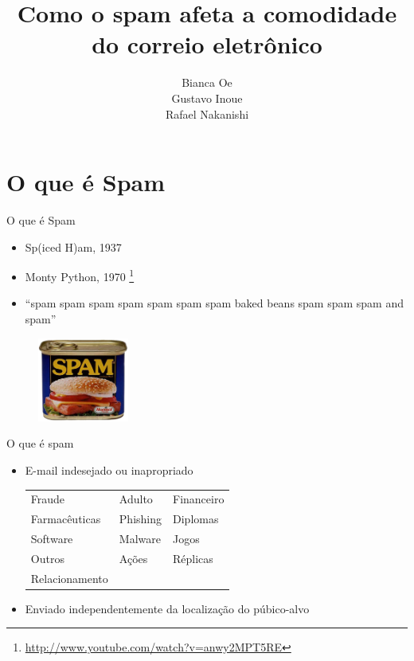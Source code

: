 \documentclass[dvipdfm]{beamer}
\title{Como o spam afeta a comodidade do correio eletrônico}
\author{Bianca Oe\\
		Gustavo Inoue\\
		Rafael Nakanishi}
\institute{Instituto de Ciências Matemáticas e Computação}
\begin{document}
\begin{frame}
	\titlepage
\end{frame}

\begin{frame}
	\begin{scriptsize}
	\end{scriptsize}
\end{frame}

\section{O que é Spam}
\begin{frame}{O que é Spam}
	\begin{itemize}
		\item Sp(iced H)am, 1937
		\item Monty Python, 1970 \footnote{\url{http://www.youtube.com/watch?v=anwy2MPT5RE}}
		\item “spam spam spam spam spam spam spam baked beans  spam spam spam and  spam”
	\end{itemize}

	\begin{figure}[h]
		\centering
		\includegraphics[width=3cm]{Imagens/spam/spam.png}
	\end{figure}
\end{frame}

\begin{frame}{O que é spam}
	\begin{itemize}
		\item E-mail indesejado ou inapropriado
			\begin{table}
			\begin{flushleft}
				\begin{tabular}{p{0.25\textwidth} p{} p{}}
					Fraude & Adulto & Financeiro \\
					Farmacêuticas & Phishing & Diplomas \\
					Software & Malware & Jogos \\
					Outros & Ações & Réplicas \\
					Relacionamento\\
				\end{tabular}
			\end{flushleft}
			\end{table}

		\item Enviado independentemente da localização do púbico-alvo
	\end{itemize}
\end{frame}
\end{document}
